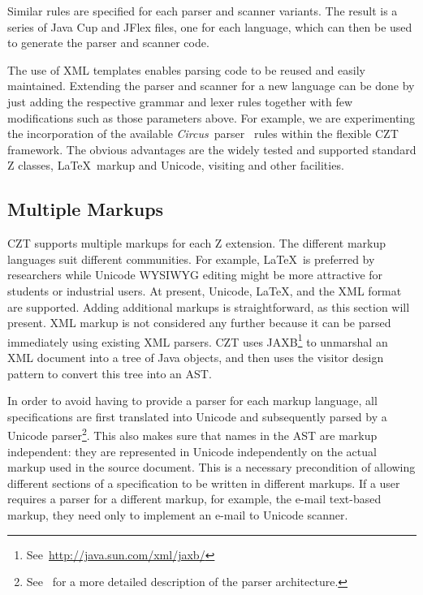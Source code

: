 \documentclass{llncs}
\newcommand{\Circus}{{\sf\slshape Circus}}
\begin{document}
Similar rules are specified for each parser and scanner variants. The
result is a series of Java Cup and JFlex files, one for each language,
which can then be used to generate the parser and scanner code.

The use of XML templates enables parsing code to be reused and easily
maintained.  Extending the parser and scanner for a new language can
be done by just adding the respective grammar and lexer rules together
with few modifications such as those parameters above.  For example,
we are experimenting the incorporation of the available \Circus\
parser~\cite{circus.other:parser} rules within the flexible CZT
framework. The obvious advantages are the widely tested and supported
standard Z classes, \LaTeX\ markup and Unicode, visiting and other
facilities.

\subsection{Multiple Markups}\label{multiple-markups}

 CZT supports multiple markups for each Z extension.  The different
 markup languages suit different communities.  For example, \LaTeX\ is
 preferred by researchers while Unicode WYSIWYG editing might be more
 attractive for students or industrial users. At present, Unicode,
 \LaTeX, and the XML format are supported.  Adding additional markups
 is straightforward, as this section will present.  XML markup is not
 considered any further because it can be parsed immediately using
 existing XML parsers.  CZT uses
 JAXB\footnote{See~\url{http://java.sun.com/xml/jaxb/}} to unmarshal an
 XML document into a tree of Java objects, and then uses the visitor
 design pattern to convert this tree into an AST.

In order to avoid having to provide a parser for each markup language,
all specifications are first translated into Unicode and subsequently
parsed by a Unicode parser\footnote{See~\cite{czt} for a more detailed
description of the parser architecture.}.  This also makes sure that
names in the AST are markup independent: they are represented in
Unicode independently on the actual markup used in the source
document.  This is a necessary precondition of allowing different
sections of a specification to be written in different markups.  If a
user requires a parser for a different markup, for example, the e-mail
text-based markup, they need only to implement an e-mail to Unicode
scanner.
\end{document}

